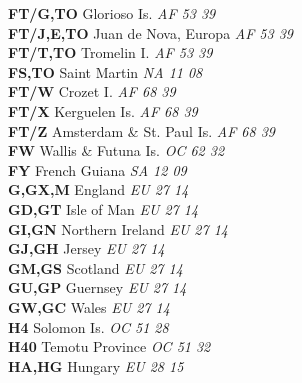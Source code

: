﻿\documentclass[landscape,a4paper]{article}
\begin{document}
\begin{multicols}{6}
\textbf{FT/G,TO                 } Glorioso Is.                       \emph{ AF     53     39    } \\
\textbf{FT/J,E,TO               } Juan de Nova, Europa               \emph{ AF     53     39    } \\
\textbf{FT/T,TO                 } Tromelin I.                        \emph{ AF     53     39    } \\
\textbf{FS,TO                   } Saint Martin                       \emph{ NA     11     08    } \\
\textbf{FT/W                    } Crozet I.                          \emph{ AF     68     39    } \\
\textbf{FT/X                    } Kerguelen Is.                      \emph{ AF     68     39    } \\
\textbf{FT/Z                    } Amsterdam \& St. Paul Is.          \emph{ AF     68     39    } \\
\textbf{FW                      } Wallis \& Futuna Is.               \emph{ OC     62     32    } \\
\textbf{FY                      } French Guiana                      \emph{ SA     12     09    } \\
\textbf{G,GX,M                  } England                            \emph{ EU     27     14    } \\
\textbf{GD,GT                   } Isle of Man                        \emph{ EU     27     14    } \\
\textbf{GI,GN                   } Northern Ireland                   \emph{ EU     27     14    } \\
\textbf{GJ,GH                   } Jersey                             \emph{ EU     27     14    } \\
\textbf{GM,GS                   } Scotland                           \emph{ EU     27     14    } \\
\textbf{GU,GP                   } Guernsey                           \emph{ EU     27     14    } \\
\textbf{GW,GC                   } Wales                              \emph{ EU     27     14    } \\
\textbf{H4                      } Solomon Is.                        \emph{ OC     51     28    } \\
\textbf{H40                     } Temotu Province                    \emph{ OC     51     32    } \\
\textbf{HA,HG                   } Hungary                            \emph{ EU     28     15    } \\

\end{multicols}
\end{document}
